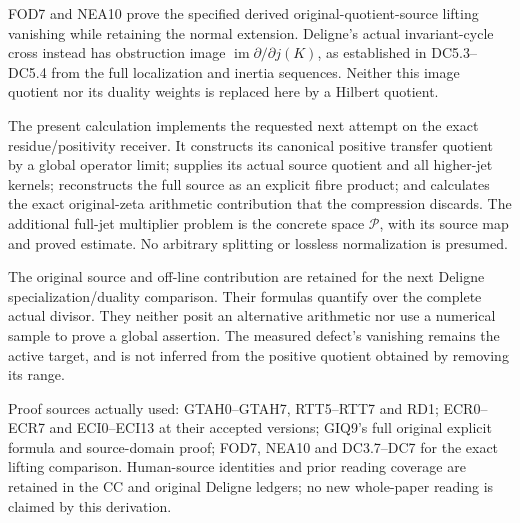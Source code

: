 FOD7 and NEA10 prove the specified derived original-quotient-source
lifting vanishing while retaining the normal extension. Deligne's actual
invariant-cycle cross instead has obstruction image
\(\operatorname{im}\partial/\partial j(K)\), as established in
DC5.3--DC5.4 from the full localization and inertia sequences. Neither
this image quotient nor its duality weights is replaced here by a
Hilbert quotient.

The present calculation implements the requested next attempt on the
exact residue/positivity receiver. It constructs its canonical positive
transfer quotient by a global operator limit; supplies its actual source
quotient and all higher-jet kernels; reconstructs the full source as an
explicit fibre product; and calculates the exact original-zeta
arithmetic contribution that the compression discards. The additional
full-jet multiplier problem is the concrete space \(\mathscr P\), with
its source map and proved estimate. No arbitrary splitting or lossless
normalization is presumed.

The original source and off-line contribution are retained for the next
Deligne specialization/duality comparison. Their formulas quantify over
the complete actual divisor. They neither posit an alternative
arithmetic nor use a numerical sample to prove a global assertion. The
measured defect's vanishing remains the active target, and is not
inferred from the positive quotient obtained by removing its range.

Proof sources actually used: GTAH0--GTAH7, RTT5--RTT7 and RD1;
ECR0--ECR7 and ECI0--ECI13 at their accepted versions; GIQ9's full
original explicit formula and source-domain proof; FOD7, NEA10 and
DC3.7--DC7 for the exact lifting comparison. Human-source identities and
prior reading coverage are retained in the CC and original Deligne
ledgers; no new whole-paper reading is claimed by this derivation.
